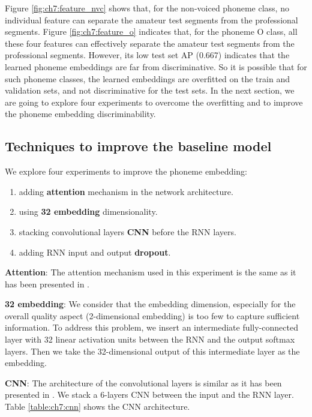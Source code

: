 Figure \ref{fig:ch7:feature_nvc} shows that, for the non-voiced phoneme class, no individual feature can separate the amateur test segments from the professional segments. Figure \ref{fig:ch7:feature_o} indicates that, for the phoneme O class, all these four features can effectively separate the amateur test segments from the professional segments. However, its low test set AP (0.667) indicates that the learned phoneme embeddings are far from discriminative. So it is possible that for such phoneme classes, the learned embeddings are overfitted on the train and validation sets, and not discriminative for the test sets. In the next section, we are going to explore four experiments to overcome the overfitting and to improve the phoneme embedding discriminability.

\subsection{Techniques to improve the baseline model}

We explore four experiments to improve the phoneme embedding:

\begin{enumerate}[itemsep=0pt]
\item adding \textbf{attention} mechanism in the network architecture.
\item using \textbf{32 embedding} dimensionality.
\item stacking convolutional layers \textbf{CNN} before the RNN layers.
\item adding RNN input and output \textbf{dropout}.
\end{enumerate}

\textbf{Attention}: The attention mechanism used in this experiment is the same as it has been presented in .

\textbf{32 embedding}: We consider that the embedding dimension, especially for the overall quality aspect (2-dimensional embedding) is too few to capture sufficient information. To address this problem, we insert an intermediate fully-connected layer with 32 linear activation units between the RNN and the output softmax layers. Then we take the 32-dimensional output of this intermediate layer as the embedding.

\textbf{CNN}: The architecture of the convolutional layers is similar as it has been presented in . We stack a 6-layers CNN between the input and the RNN layer. Table \ref{table:ch7:cnn} shows the CNN architecture. 

